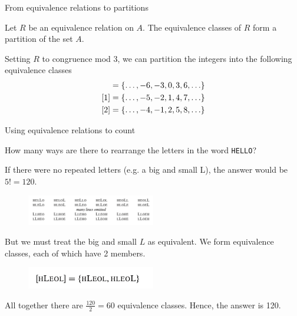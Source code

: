 \documentclass[10pt]{beamer}
\begin{document}
\begin{frame}{From equivalence relations to partitions}
\small 
 \begin{mygreenbox}[title=\text{Proposition (Scheinerman pp. 85)}]  
Let $R$ be an equivalence relation on $A$.  The equivalence classes of $R$ form a partition of the set $A$. 
\end{mygreenbox}
\vfill 
\begin{myredbox}[title=Example]
Setting $R$ to congruence mod 3, we can partition the integers into the following equivalence classes
%
\begin{align*}
[0] &= \set{\hdots, -6, -3, 0, 3, 6, \hdots} \\	
[1] &= \set{\hdots, -5, -2, 1, 4, 7, \hdots} \\	
[2] &= \set{\hdots, -4, -1, 2, 5, 8, \hdots} \\	
\end{align*}
\end{myredbox}

\end{frame}



\begin{frame}{Using equivalence relations to count}
\footnotesize 
 \begin{myyellowbox}[title=Question]  
How many ways are there to rearrange the letters in the word \texttt{HELLO}?
\end{myyellowbox}
\vfill 
 \begin{myredbox}[title=Solution]  
If there were no repeated letters (e.g. a big and small L), the answer would be $5!=120$.
%
\begin{figure}
\includegraphics[width=0.5\textwidth]{images/hello}	
\end{figure}
%
But we must treat the big and small $L$ as equivalent.  We form equivalence classes, each of which have 2 members.
%
\begin{figure}
\includegraphics[width=0.5\textwidth]{images/hello_equiv}	
\end{figure}
%
All together there are $\frac{120}{2} = 60$ equivalence classes.  Hence, the answer is 120.
\end{myredbox}

\end{frame}
\end{document}
